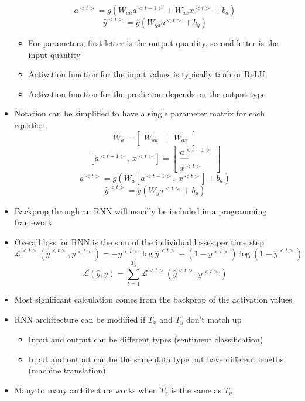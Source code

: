 \documentclass[12pt, letterpaper]{article}
\begin{document}
\begin{itemize}
\begin{figure}[ht]
        \end{figure}
        $$a^{<t>}=g(W_{aa}a^{<t-1>}+W_{ax}x^{<t>}+b_a)$$
        $$\hat{y}^{<t>}=g(W_{ya}a^{<t>}+b_y)$$
        \begin{itemize}
            \item For parameters, first letter is the output quantity, second letter is the input quantity
            \item Activation function for the input values is typically tanh or ReLU
            \item Activation function for the prediction depends on the output type
        \end{itemize}
        \item Notation can be simplified to have a single parameter matrix for each equation
        $$W_a=\begin{bmatrix}
            W_{aa} & \mid & W_{ax}
        \end{bmatrix}$$
        $$[a^{<t-1>},~x^{<t>}]=\begin{bmatrix}
            a^{<t-1>} \\
            \text{---} \\
            x^{<t>}
        \end{bmatrix}$$
        $$a^{<t>}=g(W_a[a^{<t-1>},~x^{<t>}]+b_a)$$
        $$\hat{y}^{<t>}=g(W_ya^{<t>}+b_y)$$
        \item Backprop through an RNN will usually be included in a programming framework
        \item Overall loss for RNN is the sum of the individual losses per time step
        $$\mathcal{L}^{<t>}(\hat{y}^{<t>},y^{<t>})=-y^{<t>}\log\hat{y}^{<t>}-(1-y^{<t>})\log(1-\hat{y}^{<t>})$$
        $$\mathcal{L}(\hat{y}, y)=\sum_{t=1}^{T_y}\mathcal{L}^{<t>}(\hat{y}^{<t>},y^{<t>})$$
        \item Most significant calculation comes from the backprop of the activation values
        \item RNN architecture can be modified if $T_x$ and $T_y$ don't match up
        \begin{itemize}
            \item Input and output can be different types (sentiment classification)
            \item Input and output can be the same data type but have different lengths (machine translation)
        \end{itemize}
        \item Many to many architecture works when $T_x$ is the same as $T_y$

\end{itemize}
\end{document}
